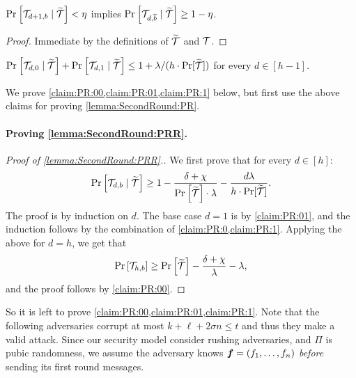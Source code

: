 \begin{claim}\label{claim:PR:0}
$\Pr_{}\left[\mathcal{T}_{d+1,b} \mid {\widetilde{\mathcal{T}}}\right] <     \eta$ implies $\Pr_{}\left[\mathcal{T}_{d,\overline{b}} \mid {\widetilde{\mathcal{T}}}\right]  \ge 1- \eta$.
\end{claim}
\begin{proof}
	Immediate by the definitions of ${\widetilde{\mathcal{T}}}$ and $\mathcal{T}$.
\end{proof}


\begin{claim}\label{claim:PR:1}
$\Pr_{}\left[\mathcal{T}_{d,0} \mid {\widetilde{\mathcal{T}}}\right]  + \Pr_{}\left[\mathcal{T}_{d,1} \mid {\widetilde{\mathcal{T}}}\right]  \le 1 +   \lambda/(h\cdot\Pr[{\widetilde{\mathcal{T}}}])$ for  every $d \in [h-1]$.
\end{claim}

We prove \cref{claim:PR:00,claim:PR:01,claim:PR:1} below, but first use the above claims  for proving \cref{lemma:SecondRound:PR}.


\paragraph{Proving  \cref{lemma:SecondRound:PRR}.}


\begin{proof}[Proof of \cref{lemma:SecondRound:PRR}.]
We first prove that  for every $d\in [h]$:
\begin{align*}
\Pr_{}\left[\mathcal{T}_{d,b} \mid {\widetilde{\mathcal{T}}}\right] \ge   1- \frac{\delta + \chi }{\Pr_{}\left[{\widetilde{\mathcal{T}}}\right]\cdot \lambda} - \frac{d\lambda}{h\cdot\Pr[{\widetilde{\mathcal{T}}}]}.
\end{align*}	
The proof is by induction on $d$. The base case  $d=1$ is by \cref{claim:PR:01}, and the induction follows by the combination of  \cref{claim:PR:0,claim:PR:1}. Applying the above for $d=h$, we get that
\begin{align}\label{eq:lemma:SecondRound:PR:1}
\Pr_{}\left[\mathcal{T}_{h,b} \right] \ge   \Pr_{}\left[{\widetilde{\mathcal{T}}}\right]- \frac{\delta + \chi }{\lambda} - \lambda,
\end{align}	
and the proof  follows by \cref{claim:PR:00}.
\end{proof}





So it is left to prove  \cref{claim:PR:00,claim:PR:01,claim:PR:1}. Note that the following adversaries corrupt at most $k + \ell + 2\sigma n \le t$ and thus they make a valid attack.  Since our security model consider rushing adversaries, and $\Pi$ is pubic randomness, we assume the adversary  knows   ${ \boldsymbol{f}} = (f_1,\ldots,f_n)$ \emph{before} sending its first round messages.


